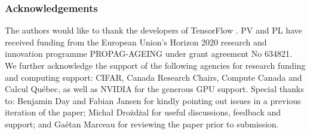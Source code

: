 \documentclass{article} %
\begin{document}
\subsubsection*{Acknowledgements}

The authors would like to thank the developers of TensorFlow \citep{tensorflow2015-whitepaper}. PV and PL have received funding from the European Union's Horizon 2020 research and innovation programme PROPAG-AGEING under grant agreement No 634821. We further acknowledge the support of the following agencies for research funding and computing support: CIFAR, Canada Research Chairs, Compute Canada and Calcul Qu\'{e}bec, as well as NVIDIA for the generous GPU support. Special thanks to: Benjamin Day and Fabian Jansen for kindly pointing out issues in a previous iteration of the paper; Micha\l{} Dro\.{z}d\.{z}al for useful discussions, feedback and support; and Ga\'{e}tan Marceau for reviewing the paper prior to submission.




\end{document}
